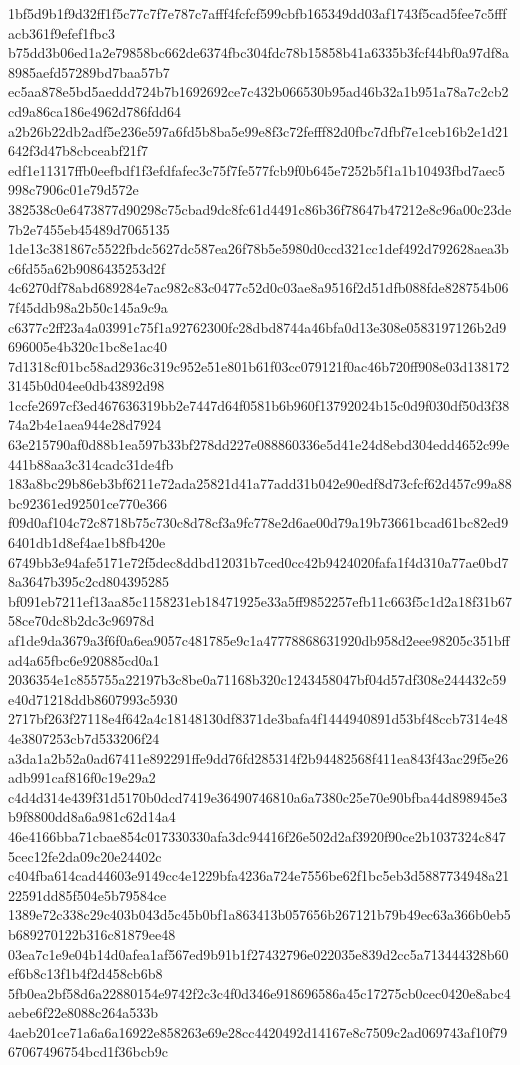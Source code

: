 {1bf5d9b1f9d32ff1f5c77c7f7e787c7afff4fcfcf599cbfb165349dd03af1743f5cad5fee7c5fffacb361f9efef1fbc3
b75dd3b06ed1a2e79858bc662de6374fbc304fdc78b15858b41a6335b3fcf44bf0a97df8a8985aefd57289bd7baa57b7
ec5aa878e5bd5aeddd724b7b1692692ce7c432b066530b95ad46b32a1b951a78a7c2cb2cd9a86ca186e4962d786fdd64
a2b26b22db2adf5e236e597a6fd5b8ba5e99e8f3c72fefff82d0fbc7dfbf7e1ceb16b2e1d21642f3d47b8cbceabf21f7
edf1e11317ffb0eefbdf1f3efdfafec3c75f7fe577fcb9f0b645e7252b5f1a1b10493fbd7aec5998c7906c01e79d572e
382538c0e6473877d90298c75cbad9dc8fc61d4491c86b36f78647b47212e8c96a00c23de7b2e7455eb45489d7065135
1de13c381867c5522fbdc5627dc587ea26f78b5e5980d0ccd321cc1def492d792628aea3bc6fd55a62b9086435253d2f
4c6270df78abd689284e7ac982c83c0477c52d0c03ae8a9516f2d51dfb088fde828754b067f45ddb98a2b50c145a9c9a
c6377c2ff23a4a03991c75f1a92762300fc28dbd8744a46bfa0d13e308e0583197126b2d9696005e4b320c1bc8e1ac40
7d1318cf01bc58ad2936c319c952e51e801b61f03cc079121f0ac46b720ff908e03d1381723145b0d04ee0db43892d98
1ccfe2697cf3ed467636319bb2e7447d64f0581b6b960f13792024b15c0d9f030df50d3f3874a2b4e1aea944e28d7924
63e215790af0d88b1ea597b33bf278dd227e088860336e5d41e24d8ebd304edd4652c99e441b88aa3c314cadc31de4fb
183a8bc29b86eb3bf6211e72ada25821d41a77add31b042e90edf8d73cfcf62d457c99a88bc92361ed92501ce770e366
f09d0af104c72c8718b75c730c8d78cf3a9fc778e2d6ae00d79a19b73661bcad61bc82ed96401db1d8ef4ae1b8fb420e
6749bb3e94afe5171e72f5dec8ddbd12031b7ced0cc42b9424020fafa1f4d310a77ae0bd78a3647b395c2cd804395285
bf091eb7211ef13aa85c1158231eb18471925e33a5ff9852257efb11c663f5c1d2a18f31b6758ce70dc8b2dc3c96978d
af1de9da3679a3f6f0a6ea9057c481785e9c1a47778868631920db958d2eee98205c351bffad4a65fbc6e920885cd0a1
2036354e1c855755a22197b3c8be0a71168b320c1243458047bf04d57df308e244432c59e40d71218ddb8607993c5930
2717bf263f27118e4f642a4c18148130df8371de3bafa4f1444940891d53bf48ccb7314e484e3807253cb7d533206f24
a3da1a2b52a0ad67411e892291ffe9dd76fd285314f2b94482568f411ea843f43ac29f5e26adb991caf816f0c19e29a2
c4d4d314e439f31d5170b0dcd7419e36490746810a6a7380c25e70e90bfba44d898945e3b9f8800dd8a6a981c62d14a4
46e4166bba71cbae854c017330330afa3dc94416f26e502d2af3920f90ce2b1037324c8475cec12fe2da09c20e24402c
c404fba614cad44603e9149cc4e1229bfa4236a724e7556be62f1bc5eb3d5887734948a2122591dd85f504e5b79584ce
1389e72c338c29c403b043d5c45b0bf1a863413b057656b267121b79b49ec63a366b0eb5b689270122b316c81879ee48
03ea7c1e9e04b14d0afea1af567ed9b91b1f27432796e022035e839d2cc5a713444328b60ef6b8c13f1b4f2d458cb6b8
5fb0ea2bf58d6a22880154e9742f2c3c4f0d346e918696586a45c17275cb0cec0420e8abc4aebe6f22e8088c264a533b
4aeb201ce71a6a6a16922e858263e69e28cc4420492d14167e8c7509c2ad069743af10f7967067496754bcd1f36bcb9c
}
